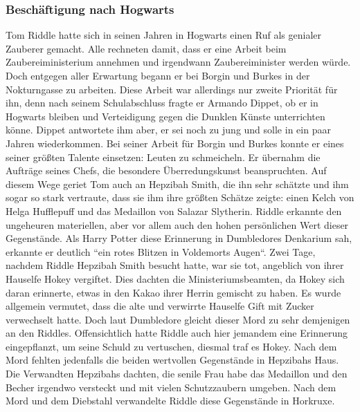 \documentclass[a4paper, 10pt]{article}
\begin{document}
\subsubsection*{\large Beschäftigung nach Hogwarts}
Tom Riddle hatte sich in seinen Jahren in Hogwarts einen Ruf als genialer Zauberer gemacht. Alle rechneten damit, dass er eine Arbeit beim Zaubereiministerium annehmen und irgendwann Zaubereiminister werden würde. Doch entgegen aller Erwartung begann er bei Borgin und Burkes in der Nokturngasse zu arbeiten. Diese Arbeit war allerdings nur zweite Priorität für ihn, denn nach seinem Schulabschluss fragte er Armando Dippet, ob er in Hogwarts bleiben und Verteidigung gegen die Dunklen Künste unterrichten könne. Dippet antwortete ihm aber, er sei noch zu jung und solle in ein paar Jahren wiederkommen.
\vspace{10pt}
\newline
Bei seiner Arbeit für Borgin und Burkes konnte er eines seiner größten Talente einsetzen: Leuten zu schmeicheln. Er übernahm die Aufträge seines Chefs, die besondere Überredungskunst beanspruchten. Auf diesem Wege geriet Tom auch an Hepzibah Smith, die ihn sehr schätzte und ihm sogar so stark vertraute, dass sie ihm ihre größten Schätze zeigte: einen Kelch von Helga Hufflepuff und das Medaillon von Salazar Slytherin. Riddle erkannte den ungeheuren materiellen, aber vor allem auch den hohen persönlichen Wert dieser Gegenstände. Als Harry Potter diese Erinnerung in Dumbledores Denkarium sah, erkannte er deutlich “ein rotes Blitzen in Voldemorts Augen“. Zwei Tage, nachdem Riddle Hepzibah Smith besucht hatte, war sie tot, angeblich von ihrer Hauselfe Hokey vergiftet. Dies dachten die Ministeriumsbeamten, da Hokey sich daran erinnerte, etwas in den Kakao ihrer Herrin gemischt zu haben. Es wurde allgemein vermutet, dass die alte und verwirrte Hauselfe Gift mit Zucker verwechselt hatte. Doch laut Dumbledore gleicht dieser Mord zu sehr demjenigen an den Riddles. Offensichtlich hatte Riddle auch hier jemandem eine Erinnerung eingepflanzt, um seine Schuld zu vertuschen, diesmal traf es Hokey. Nach dem Mord fehlten jedenfalls die beiden wertvollen Gegenstände in Hepzibahs Haus. Die Verwandten Hepzibahs dachten, die senile Frau habe das Medaillon und den Becher irgendwo versteckt und mit vielen Schutzzaubern umgeben.
\vspace{10pt}
\newline
Nach dem Mord und dem Diebstahl verwandelte Riddle diese Gegenstände in Horkruxe.
\end{document}
